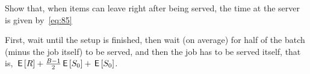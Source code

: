 \begin{exercise}\label{ex:492}
Show that, when items can leave right after being served, the time at the server is given by~\cref{eq:85}
\begin{solution}
 First, wait until the setup is finished, then wait (on average) for half of the batch (minus the job itself) to be served, and then the job has to be served itself, that is,
$\,\mathsf{E}\left[R\right] + \frac{B-1}{2}\,\mathsf{E}\left[S_0\right] +\,\mathsf{E}\left[S_0\right]$.
\end{solution}
\end{exercise}






